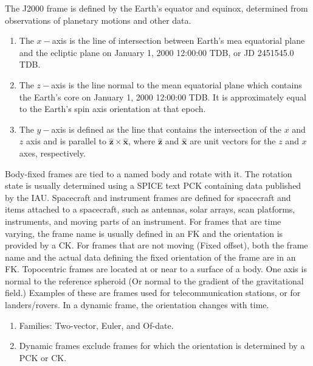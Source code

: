 \documentclass[crop=false,class=book]{standalone}
\begin{document}
            \begin{definition}
            The J2000 frame is defined by the Earth's equator and equinox, determined from observations of planetary motions and other data. 
            \begin{enumerate}
                \item The $x-$axis is the line of intersection between Earth's mea equatorial plane and the ecliptic plane on January 1, 2000 12:00:00 TDB, or JD 2451545.0 TDB.
                \item The $z-$axis is the line normal to the mean equatorial plane which contains the Earth's core on January 1, 2000 12:00:00 TDB. It is approximately equal to the Earth's spin axis orientation at that epoch.
                \item The $y-$axis is defined as the line that contains the intersection of the $x$ and $z$ axis and is parallel to $\hat{\mathbf{z}}\times \hat{\mathbf{x}}$, where $\hat{\mathbf{z}}$ and $\hat{\mathbf{x}}$ are unit vectors for the $z$ and $x$ axes, respectively.
            \end{enumerate}
            \end{definition}
            Body-fixed frames are tied to a named body and rotate with it. The rotation state is usually determined using a SPICE text PCK containing data published by the IAU. Spacecraft and instrument frames are defined for spacecraft and items attached to a spacecraft, such as antennas, solar arrays, scan platforms, instruments, and moving parts of an instrument. For frames that are time varying, the frame name is usually defined in an FK and the orientation is provided by a CK. For frames that are not moving (Fixed offset), both the frame name and the actual data defining the fixed orientation of the frame are in an FK. Topocentric frames are located at or near to a surface of a body. One axis is normal to the reference spheroid (Or normal to the gradient of the gravitational field.) Examples of these are frames used for telecommunication stations, or for landers/rovers. In a dynamic frame, the orientation changes with time.
            \begin{enumerate}
                \item[] Families: Two-vector, Euler, and Of-date.
                \item[] Dynamic frames exclude frames for which the orientation is determined by a PCK or CK.
            \end{enumerate}
\end{document}
